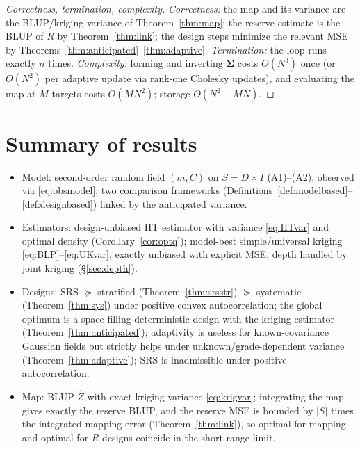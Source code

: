 \documentclass{amsart}
\theoremstyle{definition}
\newcommand{\Zhat}{\widehat Z}
\begin{document}
\begin{proof}[Correctness, termination, complexity]
\emph{Correctness:} the map and its variance are the BLUP/kriging-variance
of Theorem~\ref{thm:map}; the reserve estimate is the BLUP of $R$ by
Theorem~\ref{thm:link}; the design steps minimize the relevant MSE by
Theorems~\ref{thm:anticipated}--\ref{thm:adaptive}. \emph{Termination:} the
loop runs exactly $n$ times. \emph{Complexity:} forming and inverting
$\boldsymbol\Sigma$ costs $O(N^3)$ once (or $O(N^2)$ per adaptive update
via rank-one Cholesky updates), and evaluating the map at $M$ targets costs
$O(MN^2)$; storage $O(N^2+MN)$.
\end{proof}

\section{Summary of results}

\begin{itemize}
\item[(a)] Model: second-order random field $(m,C)$ on $S=D\times I$
(A1)--(A2), observed via \eqref{eq:obsmodel}; two comparison frameworks
(Definitions~\ref{def:modelbased}--\ref{def:designbased}) linked by the
anticipated variance.
\item[(b)] Estimators: design-unbiased HT estimator with variance
\eqref{eq:HTvar} and optimal density (Corollary~\ref{cor:optq}); model-best
simple/universal kriging \eqref{eq:BLP}--\eqref{eq:UKvar}, exactly unbiased
with explicit MSE; depth handled by joint kriging (\S\ref{sec:depth}).
\item[(c)] Designs: SRS $\succeq$ stratified (Theorem~\ref{thm:srsstr})
$\succeq$ systematic (Theorem~\ref{thm:sys}) under positive convex
autocorrelation; the global optimum is a space-filling deterministic design
with the kriging estimator (Theorem~\ref{thm:anticipated}); adaptivity is
useless for known-covariance Gaussian fields but strictly helps under
unknown/grade-dependent variance (Theorem~\ref{thm:adaptive}); SRS is
inadmissible under positive autocorrelation.
\item[(d)] Map: BLUP $\Zhat$ with exact kriging variance
\eqref{eq:krigvar}; integrating the map gives exactly the reserve BLUP, and
the reserve MSE is bounded by $|S|$ times the integrated mapping error
(Theorem~\ref{thm:link}), so optimal-for-mapping and optimal-for-$R$
designs coincide in the short-range limit.
\end{itemize}
\end{document}
